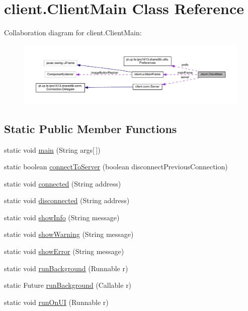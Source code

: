 \hypertarget{classclient_1_1_client_main}{}\section{client.\+Client\+Main Class Reference}
\label{classclient_1_1_client_main}


Collaboration diagram for client.\+Client\+Main\+:
\nopagebreak
\begin{figure}[H]
\begin{center}
\leavevmode
\includegraphics[width=350pt]{classclient_1_1_client_main__coll__graph}
\end{center}
\end{figure}
\subsection*{Static Public Member Functions}
\begin{DoxyCompactItemize}
\item 
static void \hyperlink{classclient_1_1_client_main_a1c318ff544d49e68acce0aeac5446336}{main} (String args\mbox{[}$\,$\mbox{]})
\item 
static boolean \hyperlink{classclient_1_1_client_main_aecd59c193bdb0536d649be78f72149b0}{connect\+To\+Server} (boolean disconnect\+Previous\+Connection)
\item 
static void \hyperlink{classclient_1_1_client_main_a37085a4271a663544855402f2892fb51}{connected} (String address)
\item 
static void \hyperlink{classclient_1_1_client_main_a824ffde5fd1b48d4a6ec25a9b00c3dc5}{disconnected} (String address)
\item 
static void \hyperlink{classclient_1_1_client_main_af975fd50f5fb1cc3ec29b65854b2a412}{show\+Info} (String message)
\item 
static void \hyperlink{classclient_1_1_client_main_a0964644423f3d533ca394456ee6f6c95}{show\+Warning} (String message)
\item 
static void \hyperlink{classclient_1_1_client_main_ab814569831a92249ded3d7258c0ac929}{show\+Error} (String message)
\item 
static void \hyperlink{classclient_1_1_client_main_afb84263c3e741a3f35611ef1b28b838e}{run\+Background} (Runnable r)
\item 
static Future \hyperlink{classclient_1_1_client_main_a0b66d467ed48a17869c86a90992937cc}{run\+Background} (Callable r)
\item 
static void \hyperlink{classclient_1_1_client_main_ad1c0bf16363beb967cc1a7a9a41a4e21}{run\+On\+UI} (Runnable r)
\end{DoxyCompactItemize}
